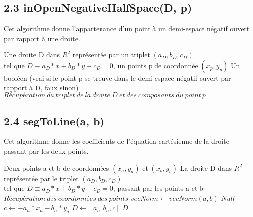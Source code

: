\documentclass[a4paper,12pt]{report}	%
\begin{document}
	{\subsection*{2.3 inOpenNegativeHalfSpace(D, p)}}
	
	\noindent Cet algorithme donne l'appartenance d'un point à un demi-espace négatif ouvert par rapport à une droite.

	\begin{algorithm}
	\caption{$inOpenNegativeHalfSpace(D, p)$}
	\label{Modele pour un algo}
	\begin{algorithmic} [1]
	\REQUIRE Une droite D dans $R^2$ représentée par un triplet $(a_{D}, b_{D}, c_{D})$ \\tel que $D \equiv a_{D}*x + b_{D}*y + c_{D} = 0$, un points p de coordonnée $(x_{p}, y_{p})$
	\ENSURE Un booléen (vrai si le point  p se trouve dans le demi-espace négatif ouvert par rapport à D, faux sinon)
	\STATE $Récupération\ du\ triplet\ de\ la\ droite\ D\ et\ des\ composants\ du\ point\ p$
	\RETURN \TRUE
	\ENDIF
	\RETURN \FALSE
	\end{algorithmic}
	\end{algorithm}
	
	{\subsection*{2.4 segToLine(a, b)}}
	
	\noindent Cet algorithme donne les coefficients de l'équation cartésienne de la droite passant par les deux points.
	
	\begin{algorithm}
	\caption{$segToLine(a, b)$}
	\label{Modele pour un algo}
	\begin{algorithmic} [1]
	\REQUIRE Deux points a et b de coordonnées $(x_{a}, y_{a})$ et $(x_{b}, y_{b})$
	\ENSURE La droite D dans $R^2$ représentée par le triplet $(a_{D}, b_{D}, c_{D})$ \\tel que $D \equiv a_{D}*x + b_{D}*y + c_{D} = 0$, passant par les points a et b
	\STATE $Récupération\ des\ coordonnées\ des\ points$
	\STATE $ vecNorm \gets vecNorm(a, b) $
	\IF{$ a_{n} = 0\ \AND\ b_{n} = 0 $}
	\RETURN $Null$
	\ELSE
	\STATE $ c \gets - a_{n}*x_{a} - b_{n}*y_{a} $
	\STATE $ D \gets [a_{n}, b_{n}, c] $
	\RETURN $D$
	\ENDIF
	\end{algorithmic}
	\end{algorithm}
	
\end{document}

